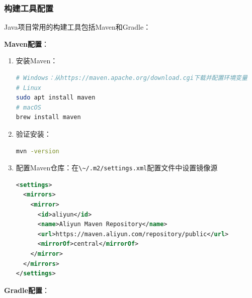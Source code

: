 \subsubsection{构建工具配置}\label{ux6784ux5efaux5de5ux5177ux914dux7f6e}

Java项目常用的构建工具包括Maven和Gradle：

\textbf{Maven配置}：

\begin{enumerate}
\def\labelenumi{\arabic{enumi}.}
\item
  安装Maven：

\begin{lstlisting}[language=bash]
# Windows：从https://maven.apache.org/download.cgi下载并配置环境变量
# Linux
sudo apt install maven
# macOS
brew install maven
\end{lstlisting}
\item
  验证安装：

\begin{lstlisting}[language=bash]
mvn -version
\end{lstlisting}
\item
  配置Maven仓库：在\passthrough{\lstinline!\~/.m2/settings.xml!}配置文件中设置镜像源

\begin{lstlisting}[language=XML]
<settings>
  <mirrors>
    <mirror>
      <id>aliyun</id>
      <name>Aliyun Maven Repository</name>
      <url>https://maven.aliyun.com/repository/public</url>
      <mirrorOf>central</mirrorOf>
    </mirror>
  </mirrors>
</settings>
\end{lstlisting}
\end{enumerate}

\textbf{Gradle配置}：

